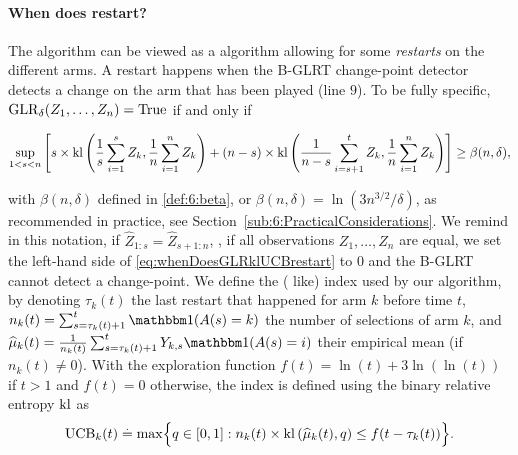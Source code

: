 \paragraph{When does \GLRklUCB{} restart?}

The \GLRklUCB{} algorithm can be viewed as a \klUCB{} algorithm allowing for some \emph{restarts} on the different arms. A restart happens when the B-GLRT change-point detector detects a change on the arm that has been played (line $9$).
%
To be fully specific, $\mathrm{GLR}_\delta(Z_1,\dots,Z_n) = \mathrm{True}$ if and only if
\begin{small}
    \begin{equation}\label{eq:whenDoesGLRklUCBrestart}
        \sup_{1 < s < n} \left[s \times \mathrm{kl} \left(\frac{1}{s}\sum_{i=1}^s Z_k , \frac{1}{n}\sum_{i=1}^n Z_k\right) + (n-s) \times \mathrm{kl} \left(\frac{1}{n-s}\sum_{i=s+1}^t Z_k , \frac{1}{n}\sum_{i=1}^n Z_k\right)\right] \geq \beta(n,\delta),
    \end{equation}
\end{small}
%
with $\beta(n,\delta)$ defined in \eqref{def:6:beta}, or $\beta(n,\delta) = \ln(3n^{3/2}/\delta)$, as recommended in practice, see Section~\ref{sub:6:PracticalConsiderations}.
We remind in this notation, if $\widehat{Z}_{1:s}=\widehat{Z}_{s+1:n}$, \ie, if all observations $Z_1,\dots,Z_n$ are equal, we set the left-hand side of \eqref{eq:whenDoesGLRklUCBrestart} to $0$ and the B-GLRT cannot detect a change-point.
%
We define the (\klUCB{} like) index used by our algorithm, by denoting
$\tau_k(t)$ the last restart that happened for arm $k$ before time $t$,
$n_k(t) = \sum_{s=\tau_k(t)+1}^{t} \indic(A(s)=k)$
the number of selections of arm $k$, and
$\widehat{\mu}_k(t) = \frac{1}{n_k(t)} \sum_{s=\tau_k(t)+1}^{t}Y_{k,s} \indic(A(s)=i)$
their empirical mean (if $n_k(t)\neq0$).
%
With the exploration function $f(t) = \ln(t) + 3 \ln(\ln(t))$ if $t>1$ and $f(t)=0$ otherwise,
the index is defined using the binary relative entropy $\mathrm{kl}$ as
%
\begin{equation}\label{def:6:UCB}
    \mathrm{UCB}_k(t) \overset{.}{=} \max \Bigl\{ q\in[0,1] : n_k(t) \times \mathrm{kl}\left(\widehat{\mu}_k(t),q\right) \leq f(t - \tau_k(t)) \Bigr\}.
\end{equation}


